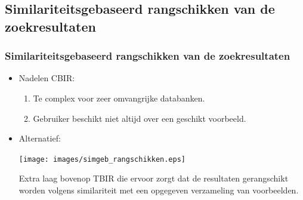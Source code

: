 \documentclass[dutch]{beamer}
\theoremstyle{definition}
\theoremstyle{remark}
\theoremstyle{example}
\begin{document}
\subsection{Similariteitsgebaseerd rangschikken van de zoekresultaten}
\frame
{
  \frametitle{Similariteitsgebaseerd rangschikken van de zoekresultaten}
  
  \begin{itemize}
  \item Nadelen CBIR:
  \begin{enumerate}
    \item Te complex voor zeer omvangrijke databanken.
    \item Gebruiker beschikt niet altijd over een geschikt voorbeeld.
  \end{enumerate}

  \item Alternatief:
  \begin{center}
  \texttt{[image: images/simgeb\_rangschikken.eps]}
  \end{center}
  Extra laag bovenop TBIR die ervoor zorgt dat de resultaten gerangschikt
  worden volgens similariteit met een opgegeven verzameling van voorbeelden.
  \end{itemize}
}
\end{document}
